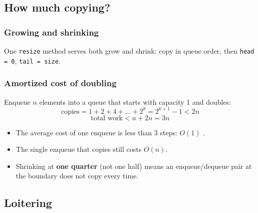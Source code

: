 \documentclass[aspectratio=169,10pt,compress]{beamer}
\begin{document}
\subsection[Copies]{How much copying?}




\begin{frame}[t,fragile] \frametitle{Growing and shrinking}
  \small One \texttt{resize} method serves both grow and shrink: copy in queue order, then \texttt{head = 0}, \texttt{tail = size}.
\end{frame}




\begin{frame}[t,fragile] \frametitle{Amortized cost of doubling}
  Enqueue $n$ elements into a queue that starts with capacity 1 and doubles:
  \[
  	\text{copies} = 1 + 2 + 4 + \dots + 2^{k} = 2^{k+1} - 1 < 2n
  \]
  \[
  	\text{total work} < n + 2n = 3n
  \]
  \begin{itemize}\small
    \item The average cost of one enqueue is less than 3 steps: $O(1)$ .
    \item The single enqueue that copies still costs $O(n)$.
    \item Shrinking at \textbf{one quarter} (not one half) means an enqueue/dequeue pair at the boundary does not copy every time.
  \end{itemize}
\end{frame}

\subsection[Loitering]{Loitering}
\end{document}
